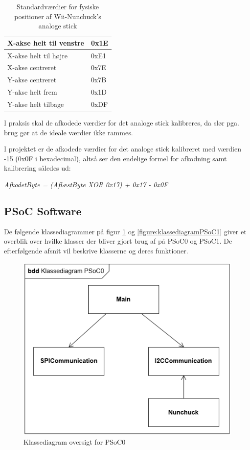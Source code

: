 \begin{table}[H]
	\centering
	\begin{tabular}{|l|l|}
		\hline
		X-akse helt til venstre & 0x1E \\ \hline
		X-akse helt til højre   & 0xE1 \\ \hline
		X-akse centreret        & 0x7E \\ \hline
		Y-akse centreret        & 0x7B \\ \hline
		Y-akse helt frem        & 0x1D \\ \hline
		Y-akse helt tilbage     & 0xDF \\ \hline
	\end{tabular}
	\caption{Standardværdier for fysiske positioner af Wii-Nunchuck's analoge stick}
	\label{tabel:WiiNunchuckStickPositioner}
\end{table}

I praksis skal de afkodede værdier for det analoge stick kalibreres, da slør pga. brug gør at de ideale værdier ikke rammes. 

I projektet er de afkodede værdier for det analoge stick kalibreret med værdien -15 (0x0F i hexadecimal), altså ser den endelige formel for afkodning samt kalibrering således ud:

\textit{AfkodetByte = (AflæstByte XOR 0x17) + 0x17 - 0x0F}

\subsection{PSoC Software}
De følgende klassediagrammer på figur \ref{figure:klassediagramPSoC0} og \ref{figure:klassediagramPSoC1} giver et overblik over hvilke klasser der bliver gjort brug af på PSoC0 og PSoC1. De efterfølgende afsnit vil beskrive klasserne og deres funktioner.

\begin{figure}[H]
	\centering
	\includegraphics[width=.7\textwidth]{DesignOgImplementering/images/PSoC0KlassediagramOversigt}
	\caption{Klassediagram oversigt for PSoC0}
	\label{figure:klassediagramPSoC0}
\end{figure}

